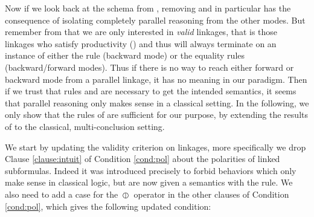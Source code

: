 Now if we look back at the schema from , removing
{} and {} in particular has the consequence
of isolating completely parallel reasoning from the other modes. But remember
from  that we are only interested in \emph{valid} linkages, that
is those linkages who satisfy productivity () and thus will
always terminate on an instance of either the {} rule (backward mode)
or the equality rules (backward/forward modes). Thus if there is no way to reach
either forward or backward mode from a parallel linkage, it has no meaning in
our paradigm. Then if we trust that rules {} and
{} are necessary to get the intended semantics, it seems that
parallel reasoning only makes sense in a classical setting. In the following, we
only show that the rules of  are sufficient for our purpose, by
extending the results of  to the classical, multi-conclusion setting.

We start by updating the validity criterion on linkages, more specifically we
drop Clause \ref{clause:intuit} of Condition \ref{cond:pol} about the polarities
of linked subformulas. Indeed it was introduced precisely to forbid behaviors
which only make sense in classical logic, but are now given a semantics with the
{} rule. We also need to add a case for the $\operatorname{\,\varobar\,}$ operator
in the other clauses of Condition \ref{cond:pol}, which gives the following
updated condition:

